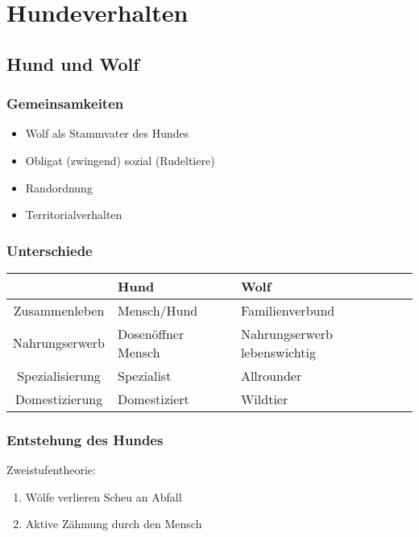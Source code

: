 \chapter{Hundeverhalten}
\label{ch:Hundeverhalten}


\section{Hund und Wolf}
\label{ch:Hundeverhalten1:sec:Hund_und_Wolf}

    \subsection{Gemeinsamkeiten}
    \begin{itemize}
        \item Wolf als Stammvater des Hundes
        \item Obligat (zwingend) sozial (Rudeltiere)
        \item Randordnung
        \item Territorialverhalten
    \end{itemize}

    \subsection{Unterschiede}
    \begin{center}
        \begin{tabular}{c|l|l}
            & \textbf{Hund} & \textbf{Wolf} \\
            \hline
            Zusammenleben & Mensch/Hund & Familienverbund \\
            Nahrungserwerb & Dosenöffner Mensch & Nahrungserwerb lebenswichtig \\
            Spezialisierung & Spezialist & Allrounder \\
            Domestizierung & Domestiziert & Wildtier
        \end{tabular}
    \end{center}

    \subsection{Entstehung des Hundes}
    Zweistufentheorie:
    \begin{enumerate}
        \item Wölfe verlieren Scheu an Abfall
        \item Aktive Zähmung durch den Mensch
    \end{enumerate}


